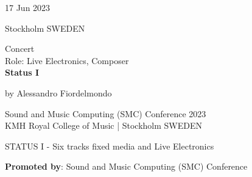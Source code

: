 \documentclass[7pt,a4paper]{article}
\begin{document}
\begin{mdframed}[
    backgroundcolor=entrygray,
    linecolor=entrygray,
    linewidth=0pt,
    innerleftmargin=6pt,
    innerrightmargin=6pt,
    innertopmargin=6pt,
    innerbottommargin=6pt,
    skipabove=0pt,
    skipbelow=0pt
]

\begin{minipage}[t]{0.28\textwidth}

17 Jun 2023

\scriptsize Stockholm SWEDEN


\end{minipage}
\begin{minipage}[t]{0.68\textwidth}
\small Concert
\\\scriptsize Role: Live Electronics, Composer
\\ \normalsize \textbf{Status I}
\par\scriptsize by Alessandro Fiordelmondo

\vspace{0.25cm}



\small Sound and Music Computing (SMC) Conference 2023\\KMH Royal College of Music | \scriptsize Stockholm SWEDEN

\vspace{0.1cm}
\scriptsize

STATUS I - Six tracks fixed media and Live Electronics

\vspace{0.1cm}
\par \textbf{Promoted by}: Sound and Music Computing (SMC) Conference
\end{minipage}
\vspace{0.25cm}
\end{mdframed}
\end{document}
